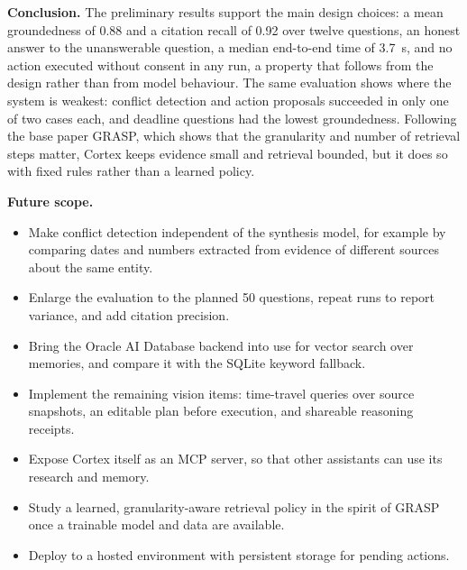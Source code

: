 \documentclass[oneside,a4paper,12pt]{report}
\begin{document}
\textbf{Conclusion.} The preliminary results support the main design choices: a mean groundedness of 0.88 and a citation recall of 0.92 over twelve questions, an honest answer to the unanswerable question, a median end-to-end time of 3.7~s, and no action executed without consent in any run, a property that follows from the design rather than from model behaviour. The same evaluation shows where the system is weakest: conflict detection and action proposals succeeded in only one of two cases each, and deadline questions had the lowest groundedness. Following the base paper GRASP, which shows that the granularity and number of retrieval steps matter, Cortex keeps evidence small and retrieval bounded, but it does so with fixed rules rather than a learned policy.

\textbf{Future scope.}
\begin{itemize}
\item Make conflict detection independent of the synthesis model, for example by comparing dates and numbers extracted from evidence of different sources about the same entity.
\item Enlarge the evaluation to the planned 50 questions, repeat runs to report variance, and add citation precision.
\item Bring the Oracle AI Database backend into use for vector search over memories, and compare it with the SQLite keyword fallback.
\item Implement the remaining vision items: time-travel queries over source snapshots, an editable plan before execution, and shareable reasoning receipts.
\item Expose Cortex itself as an MCP server, so that other assistants can use its research and memory.
\item Study a learned, granularity-aware retrieval policy in the spirit of GRASP once a trainable model and data are available.
\item Deploy to a hosted environment with persistent storage for pending actions.
\end{itemize}

% 



\end{document}
